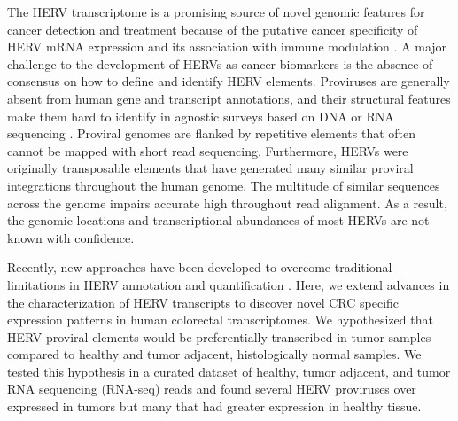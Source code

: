 The HERV transcriptome is a promising source of novel genomic features for cancer detection and treatment because of the putative cancer specificity of HERV mRNA expression and its association with immune modulation \citep{Chiappinelli2015, Roulois2015, Desai2017, Solovyov2018}.
A major challenge to the development of HERVs as cancer biomarkers is the absence of consensus on how to define and identify HERV elements.
Proviruses are generally absent from human gene and transcript annotations, and their structural features make them hard to identify in agnostic surveys based on DNA or RNA sequencing \citep{ERVmap2018, Treangen2011}.
Proviral genomes are flanked by repetitive elements that often cannot be mapped with short read sequencing.
Furthermore, HERVs were originally transposable elements that have generated many similar proviral integrations throughout the human genome.
The multitude of similar sequences across the genome impairs accurate high throughout read alignment.
As a result, the genomic locations and transcriptional abundances of most HERVs are not known with confidence.

Recently, new approaches have been developed to overcome traditional limitations in HERV annotation and quantification \citep{Attig2017, Attig2019, ERVmap2018, Telescope2019, Grabski2020}.
Here, we extend advances in the characterization of HERV transcripts to discover novel CRC specific expression patterns in human colorectal transcriptomes.
We hypothesized that HERV proviral elements would be preferentially transcribed in tumor samples compared to healthy and tumor adjacent, histologically normal samples.
We tested this hypothesis in a curated dataset of healthy, tumor adjacent, and tumor RNA sequencing (RNA-seq) reads and found several HERV proviruses over expressed in tumors but many that had greater expression in healthy tissue.
